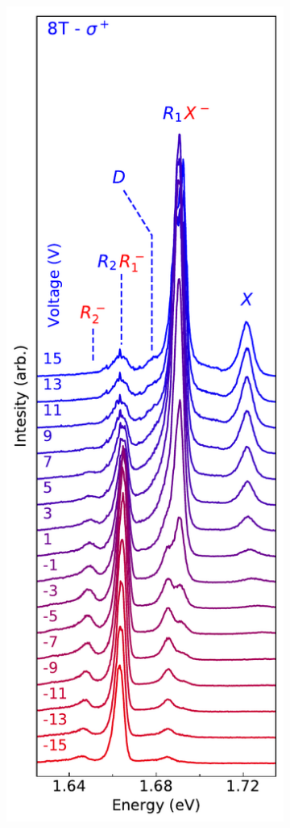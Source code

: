 \begin{figure}[t]
\begin{subfigure}{0.32\textwidth}
	\end{subfigure}
	\begin{subfigure}{0.32\textwidth}
		\caption{}
		\includegraphics[width=\textwidth]{waterfall_8T_sp}

\end{subfigure}
\end{figure}
